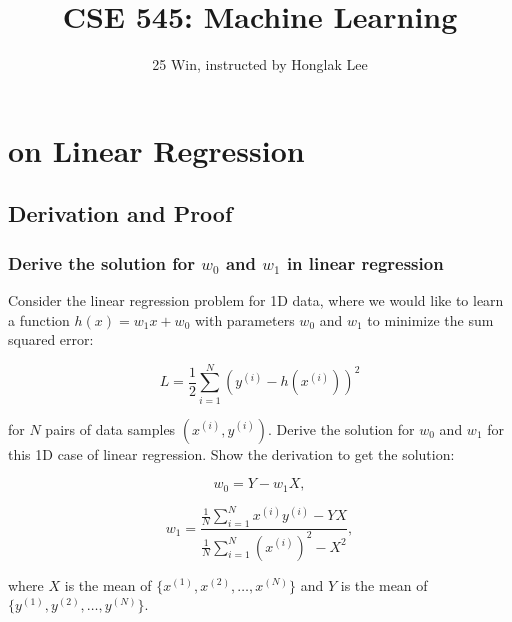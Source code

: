 \documentclass[lang=cn,11pt]{elegantbook}
\title{CSE 545: Machine Learning}
\subtitle{25 Win, instructed by Honglak Lee}
\begin{document}
\frontmatter
\tableofcontents
\mainmatter

\chapter{on Linear Regression}
\section{Derivation and Proof}

\subsection{Derive the solution for \(w_0\) and \(w_1\) in linear regression}
Consider the linear regression problem for 1D data, where we would like to learn a function \(h(x) = w_1x + w_0\) with parameters \(w_0\) and \(w_1\) to minimize the sum squared error:

\[
L = \frac{1}{2} \sum_{i=1}^{N} (y^{(i)} - h(x^{(i)}))^2
\]

for \(N\) pairs of data samples \((x^{(i)}, y^{(i)})\). Derive the solution for \(w_0\) and \(w_1\) for this 1D case of linear regression. Show the derivation to get the solution:

\[
w_0 = Y - w_1X,
\]

\[
w_1 = \frac{\frac{1}{N} \sum_{i=1}^{N} x^{(i)} y^{(i)} - YX}{\frac{1}{N} \sum_{i=1}^{N} (x^{(i)})^2 - X^2},
\]

where \(X\) is the mean of \(\{x^{(1)}, x^{(2)}, \ldots, x^{(N)}\}\) and \(Y\) is the mean of \(\{y^{(1)}, y^{(2)}, \ldots, y^{(N)}\}\).
\end{document}
